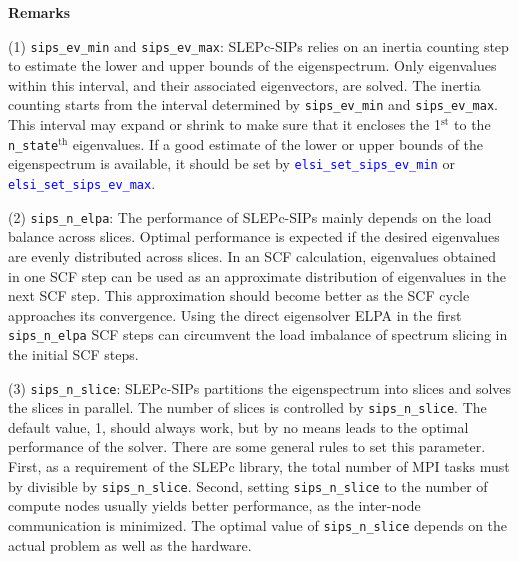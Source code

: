 \documentclass{report}
\newcommand{\api}[1]{\textcolor{blue}{\texttt{#1}}}
\begin{document}
\textbf{Remarks}

(1) \texttt{sips\_ev\_min} and \texttt{sips\_ev\_max}: SLEPc-SIPs relies on an inertia counting step to estimate the lower and upper bounds of the eigenspectrum. Only eigenvalues within this interval, and their associated eigenvectors, are solved. The inertia counting starts from the interval determined by \texttt{sips\_ev\_min} and \texttt{sips\_ev\_max}. This interval may expand or shrink to make sure that it encloses the 1$^\text{st}$ to the \texttt{n\_state}$^\text{th}$ eigenvalues. If a good estimate of the lower or upper bounds of the eigenspectrum is available, it should be set by \api{elsi\_set\_sips\_ev\_min} or \api{elsi\_set\_sips\_ev\_max}.

(2) \texttt{sips\_n\_elpa}: The performance of SLEPc-SIPs mainly depends on the load balance across slices. Optimal performance is expected if the desired eigenvalues are evenly distributed across slices. In an SCF calculation, eigenvalues obtained in one SCF step can be used as an approximate distribution of eigenvalues in the next SCF step. This approximation should become better as the SCF cycle approaches its convergence. Using the direct eigensolver ELPA in the first \texttt{sips\_n\_elpa} SCF steps can circumvent the load imbalance of spectrum slicing in the initial SCF steps.

(3) \texttt{sips\_n\_slice}: SLEPc-SIPs partitions the eigenspectrum into slices and solves the slices in parallel. The number of slices is controlled by \texttt{sips\_n\_slice}. The default value, 1, should always work, but by no means leads to the optimal performance of the solver. There are some general rules to set this parameter. First, as a requirement of the SLEPc library, the total number of MPI tasks must by divisible by \texttt{sips\_n\_slice}. Second, setting \texttt{sips\_n\_slice} to the number of compute nodes usually yields better performance, as the inter-node communication is minimized. The optimal value of \texttt{sips\_n\_slice} depends on the actual problem as well as the hardware.
\end{document}
